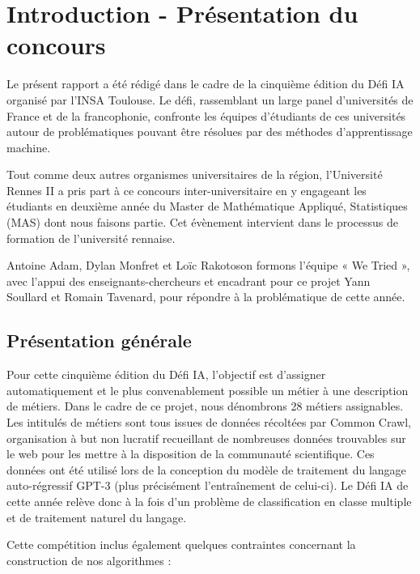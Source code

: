 \chapter{Introduction - Présentation du concours}

Le présent rapport a été rédigé dans le cadre de la cinquième édition du Défi IA organisé par l’INSA Toulouse. Le défi, rassemblant un large panel d’universités de France et de la francophonie, confronte les équipes d’étudiants de ces universités autour de problématiques pouvant être résolues par des méthodes d’apprentissage machine.
\newline

Tout comme deux autres organismes universitaires de la région, l’Université Rennes II a pris part à ce concours inter-universitaire en y engageant les étudiants en deuxième année du Master de Mathématique Appliqué, Statistiques (MAS) dont nous faisons partie. Cet évènement intervient dans le processus de formation de l’université rennaise.
\newline

Antoine Adam, Dylan Monfret et Loïc Rakotoson formons l’équipe « We Tried », avec l’appui des enseignants-chercheurs et encadrant pour ce projet Yann Soullard et Romain Tavenard, pour répondre à la problématique de cette année.
\newline

\section{Présentation générale}

Pour cette cinquième édition du Défi IA, l’objectif est d’assigner automatiquement et le plus convenablement possible un métier à une description de métiers. Dans le cadre de ce projet, nous dénombrons 28 métiers assignables. Les intitulés de métiers sont tous issues de données récoltées par Common Crawl, organisation à but non lucratif recueillant de nombreuses données trouvables sur le web pour les mettre à la disposition de la communauté scientifique. Ces données ont été utilisé lors de la conception du modèle de traitement du langage auto-régressif GPT-3 (plus précisément l’entraînement de celui-ci). Le Défi IA de cette année relève donc à la fois d’un problème de classification en classe multiple et de traitement naturel du langage.
\newline

Cette compétition inclus également quelques contraintes concernant la construction de nos algorithmes :

